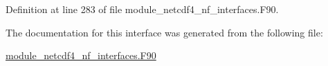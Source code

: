 Definition at line 283 of file module\+\_\+netcdf4\+\_\+nf\+\_\+interfaces.\+F90.



The documentation for this interface was generated from the following file\+:\begin{DoxyCompactItemize}
\item 
\hyperlink{module__netcdf4__nf__interfaces_8F90}{module\+\_\+netcdf4\+\_\+nf\+\_\+interfaces.\+F90}\end{DoxyCompactItemize}
